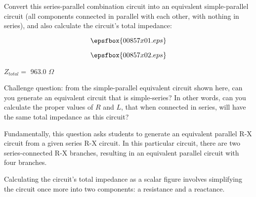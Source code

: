 

Convert this series-parallel combination circuit into an equivalent simple-parallel circuit (all components connected in parallel with each other, with nothing in series), and also calculate the circuit's total impedance:

$$\epsfbox{00857x01.eps}$$







$$\epsfbox{00857x02.eps}$$

\vskip 10pt

$Z_{total} =$ 963.0 $\Omega$

\vskip 10pt

Challenge question: from the simple-parallel equivalent circuit shown here, can you generate an equivalent circuit that is simple-series?  In other words, can you calculate the proper values of $R$ and $L$, that when connected in series, will have the same total impedance as this circuit?







Fundamentally, this question asks students to generate an equivalent parallel R-X circuit from a given series R-X circuit.  In this particular circuit, there are two series-connected R-X branches, resulting in an equivalent parallel circuit with four branches.

Calculating the circuit's total impedance as a scalar figure involves simplifying the circuit once more into two components: a resistance and a reactance.



